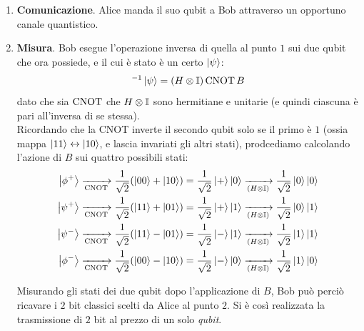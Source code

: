 \documentclass[../../InformazioneQuantistica.tex]{subfiles}
\begin{document}
\begin{enumerate}
\item \textbf{Comunicazione}. Alice manda il suo qubit a Bob attraverso un opportuno canale quantistico.
\item \textbf{Misura}. Bob esegue l'operazione inversa di quella al punto $1$ sui due qubit che ora possiede, e il cui è stato è un certo $\Ket{\psi}$:
\begin{align*}
[\op{CNOT}(H \otimes \bb{I})]^{-1} \ket{\psi} = (H\otimes \bb{I}) \op{CNOT} B
\end{align*}
dato che sia $\operatorname{CNOT}$ che $H\otimes \mathbb{I}$ sono hermitiane e unitarie (e quindi ciascuna è pari all'inversa di se stessa).\\
Ricordando che la CNOT inverte il secondo qubit solo se il primo è $1$ (ossia mappa $\Ket{11} \leftrightarrow \Ket{10}$, e lascia invariati gli altri stati), prodcediamo calcolando l'azione di $B$ sui quattro possibili stati:
\begin{align*}
    \Ket{\phi^+} &\xrightarrow[\operatorname{CNOT}]{} \frac{1}{\sqrt{2}} (\Ket{00}+\Ket{10}) = \frac{1}{\sqrt{2}} \Ket{+}\Ket{0} \xrightarrow[(H\otimes \mathbb{I})]{} \frac{1}{\sqrt{2}}\Ket{0}\Ket{0}\\
    \Ket{\psi^+} &\xrightarrow[\operatorname{CNOT}]{} \frac{1}{\sqrt{2}} (\Ket{11}+\Ket{01}) = \frac{1}{\sqrt{2}}\Ket{+}\Ket{1} \xrightarrow[(H\otimes \mathbb{I})]{} \frac{1}{\sqrt{2}} \Ket{0}\Ket{1}\\
    \Ket{\psi^-} &\xrightarrow[\operatorname{CNOT}]{}\frac{1}{\sqrt{2}}(\Ket{11}-\Ket{01}) = \frac{1}{\sqrt{2}}\Ket{-}\Ket{1} \xrightarrow[(H\otimes \mathbb{I})]{} \frac{1}{\sqrt{2}}\Ket{1}\Ket{1}\\
    \Ket{\phi^-} &\xrightarrow[\operatorname{CNOT}]{} \frac{1}{\sqrt{2}} (\Ket{00}-\Ket{10}) = \frac{1}{\sqrt{2}}\Ket{-}\Ket{0} \xrightarrow[(H\otimes \mathbb{I})]{} \frac{1}{\sqrt{2}}\Ket{1}\Ket{0}
\end{align*}

Misurando gli stati dei due qubit dopo l'applicazione di $B$, Bob può perciò ricavare i $2$ bit classici scelti da Alice al punto $2$. Si è così realizzata la trasmissione di $2$ bit al prezzo di un solo \textit{qubit}.
\end{enumerate}
\end{document}
